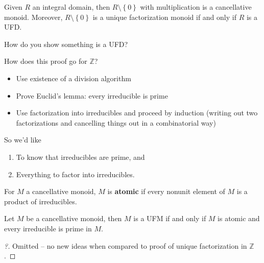 \begin{remark}

Given \(R\) an integral domain, then \(R\setminus\left\{{0}\right\}\)
with multiplication is a cancellative monoid. Moreover,
\(R\setminus\left\{{0}\right\}\) is a unique factorization monoid if and
only if \(R\) is a UFD.

\end{remark}

\begin{question}

How do you show something is a UFD?

\end{question}

How does this proof go for \({\mathbb{Z}}\)?

\begin{itemize}
\tightlist
\item
  Use existence of a division algorithm
\item
  Prove Euclid's lemma: every irreducible is prime
\item
  Use factorization into irreducibles and proceed by induction (writing
  out two factorizations and cancelling things out in a combinatorial
  way)
\end{itemize}

So we'd like

\begin{enumerate}
\def\labelenumi{\arabic{enumi}.}
\tightlist
\item
  To know that irreducibles are prime, and
\item
  Everything to factor into irreducibles.
\end{enumerate}

\begin{definition}[Atomic]

For \(M\) a cancellative monoid, \(M\) is \textbf{atomic} if every
nonunit element of \(M\) is a product of irreducibles.

\end{definition}

\begin{proposition}[?]

Let \(M\) be a cancellative monoid, then \(M\) is a UFM if and only if
\(M\) is atomic and every irreducible is prime in \(M\).

\end{proposition}

\begin{proof}[?]

Omitted -- no new ideas when compared to proof of unique factorization
in \({\mathbb{Z}}\).

\end{proof}

